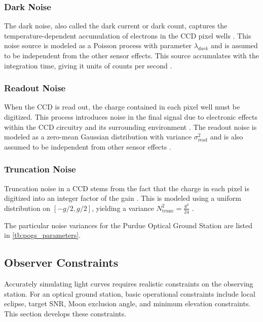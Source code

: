 \subsubsection{Dark Noise}

The dark noise, also called the dark current or dark count, captures the temperature-dependent accumulation of electrons in the CCD pixel wells \cite{krag2003}. This noise source is modeled as a Poisson process with parameter $\lambda_{dark}$ \cite{frueh2019notes} and is assumed to be independent from the other sensor effects. This source accumulates with the integration time, giving it units of counts per second \cite{krag2003}.

\subsubsection{Readout Noise}

When the CCD is read out, the charge contained in each pixel well must be digitized. This process introduces noise in the final signal due to electronic effects within the CCD circuitry and its surrounding environment \cite{krag2003}. The readout noise is modeled as a zero-mean Gaussian distribution with variance $\sigma_\mathrm{read}^2$ and is also assumed to be independent from other sensor effects \cite{frueh2019notes}.

\subsubsection{Truncation Noise}

Truncation noise in a CCD stems from the fact that the charge in each pixel is digitized into an integer factor of the gain \cite{frueh2019notes}. This is modeled using a uniform distribution on $\left[ -g/2, g/2 \right]$, yielding a variance $N^2_\mathrm{trunc} = \frac{g^2}{24}$ \cite{frueh2019notes}.

The particular noise variances for the Purdue Optical Ground Station are listed in \ref{tb:pogs_parameters}.

\subsection{Observer Constraints}

Accurately simulating light curves requires realistic constraints on the observing station. For an optical ground station, basic operational constraints include local eclipse, target SNR, Moon exclusion angle, and minimum elevation constraints. This section develops these constraints.

